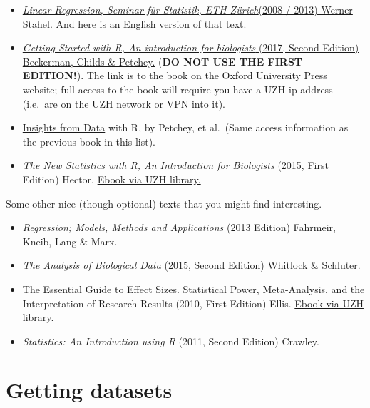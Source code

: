 \documentclass[
  letterpaper,
  8pt,
  a4paper]{book}
\providecommand{\tightlist}{%
  \setlength{\itemsep}{0pt}\setlength{\parskip}{0pt}}
\begin{document}
\begin{itemize}
\tightlist
\item
  \href{https://github.com/opetchey/BIO144/raw/master/9_assets/Stahel_LinReg.pdf}{\emph{Linear
  Regression, Seminar für Statistik, ETH Zürich}(2008 / 2013) Werner
  Stahel.} And here is an
  \href{https://github.com/opetchey/BIO144/raw/master/9_assets/Stahel_LinReg_EN.pdf}{English
  version of that text}.
\item
  \href{https://academic.oup.com/book/27290}{\emph{Getting Started with
  R, An introduction for biologists} (2017, Second Edition) Beckerman,
  Childs \& Petchey.} (\textbf{DO NOT USE THE FIRST EDITION!}). The link
  is to the book on the Oxford University Press website; full access to
  the book will require you have a UZH ip address (i.e.~are on the UZH
  network or VPN into it).
\item
  \href{https://academic.oup.com/book/39565}{Insights from Data} with R,
  by Petchey, et al.~(Same access information as the previous book in
  this list).
\item
  \emph{The New Statistics with R, An Introduction for Biologists}
  (2015, First Edition) Hector.
  \href{https://academic.oup.com/book/32474}{Ebook via UZH library.}
\end{itemize}

Some other nice (though optional) texts that you might find interesting.

\begin{itemize}
\item
  \emph{Regression; Models, Methods and Applications} (2013 Edition)
  Fahrmeir, Kneib, Lang \& Marx.
\item
  \emph{The Analysis of Biological Data} (2015, Second Edition) Whitlock
  \& Schluter.
\item
  The Essential Guide to Effect Sizes. Statistical Power, Meta-Analysis,
  and the Interpretation of Research Results (2010, First Edition)
  Ellis.
  \href{http://ezproxy.uzh.ch/login?url=http://dx.doi.org/10.1017/CBO9780511761676}{Ebook
  via UZH library.}
\item
  \emph{Statistics: An Introduction using R} (2011, Second Edition)
  Crawley.
\end{itemize}

\section*{Getting datasets}\label{getting-datasets}
\end{document}
